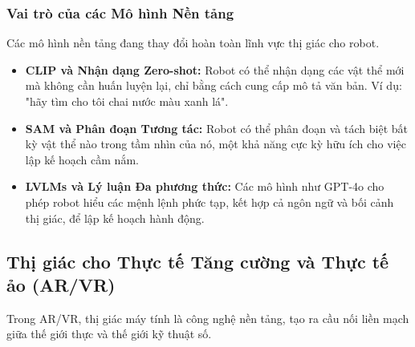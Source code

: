 \subsubsection{Vai trò của các Mô hình Nền tảng}
\label{subsubsec:foundation_models_robotics}
Các mô hình nền tảng đang thay đổi hoàn toàn lĩnh vực thị giác cho robot.
\begin{itemize}
	\item \textbf{CLIP và Nhận dạng Zero-shot:} Robot có thể nhận dạng các vật thể mới mà không cần huấn luyện lại, chỉ bằng cách cung cấp mô tả văn bản. Ví dụ: "hãy tìm cho tôi chai nước màu xanh lá".
	\item \textbf{SAM và Phân đoạn Tương tác:} Robot có thể phân đoạn và tách biệt bất kỳ vật thể nào trong tầm nhìn của nó, một khả năng cực kỳ hữu ích cho việc lập kế hoạch cầm nắm.
	\item \textbf{LVLMs và Lý luận Đa phương thức:} Các mô hình như GPT-4o cho phép robot hiểu các mệnh lệnh phức tạp, kết hợp cả ngôn ngữ và bối cảnh thị giác, để lập kế hoạch hành động.
\end{itemize}

\subsection{Thị giác cho Thực tế Tăng cường và Thực tế ảo (AR/VR)}
\label{subsec:vision_for_ar_vr}
Trong AR/VR, thị giác máy tính là công nghệ nền tảng, tạo ra cầu nối liền mạch giữa thế giới thực và thế giới kỹ thuật số.

